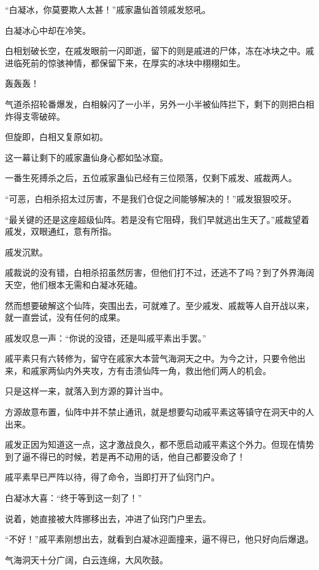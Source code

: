 
\begin{this_body}

“白凝冰，你莫要欺人太甚！”戚家蛊仙首领戚发怒吼。

白凝冰心中却在冷笑。

白相划破长空，在戚发眼前一闪即逝，留下的则是戚进的尸体，冻在冰块之中。戚进临死前的惊骇神情，都保留下来，在厚实的冰块中栩栩如生。

轰轰轰！

气道杀招轮番爆发，白相躲闪了一小半，另外一小半被仙阵拦下，剩下的则把白相炸得支零破碎。

但旋即，白相又复原如初。

这一幕让剩下的戚家蛊仙身心都如坠冰窟。

一番生死搏杀之后，五位戚家蛊仙已经有三位陨落，仅剩下戚发、戚裁两人。

“可恶，白相杀招太过厉害，不是我们仓促之间能够解决的！”戚发狠狠咬牙。

“最关键的还是这座超级仙阵。若是没有它阻碍，我们早就逃出生天了。”戚裁望着戚发，双眼通红，意有所指。

戚发沉默。

戚裁说的没有错，白相杀招虽然厉害，但他们打不过，还逃不了吗？到了外界海阔天空，他们根本无需和白凝冰死磕。

然而想要破解这个仙阵，突围出去，可就难了。至少戚发、戚裁等人自开战以来，就一直尝试，没有任何的成果。

戚发叹息一声：“你说的没错，还是叫戚平素出手罢。”

戚平素只有六转修为，留守在戚家大本营气海洞天之中。为今之计，只要令他出来，和戚家两仙内外夹攻，方有击溃仙阵一角，救出他们两人的机会。

只是这样一来，就落入到方源的算计当中。

方源故意布置，仙阵中并不禁止通讯，就是想要勾动戚平素这等镇守在洞天中的人出来。

戚发正因为知道这一点，这才激战良久，都不愿启动戚平素这个外力。但现在情势到了逼不得已的时候，若是再不动用的话，他自己都要没命了！

戚平素早已严阵以待，得了命令，当即打开了仙窍门户。

白凝冰大喜：“终于等到这一刻了！”

说着，她直接被大阵挪移出去，冲进了仙窍门户里去。

“不好！”戚平素刚想出去，就看到白凝冰迎面撞来，逼不得已，他只好向后爆退。

气海洞天十分广阔，白云连绵，大风吹鼓。


\end{this_body}
